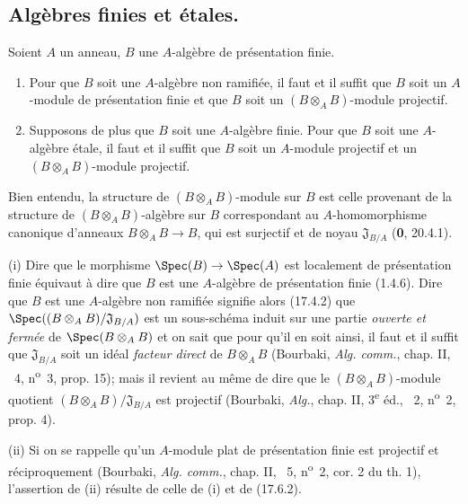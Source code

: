 \subsection{Algèbres finies et étales.}

\begin{proposition}[18.3.1]
\label{IV.18.3.1}
Soient $A$ un anneau, $B$ une $A$-algèbre de présentation finie.
\begin{enumerate}
  \item[\textup{(i)}] Pour que $B$ soit une $A$-algèbre non ramifiée, il faut et il suffit que $B$ soit un $A$-module de présentation finie et que $B$ soit un $(B\otimes_A B)$-module projectif.
  \item[\textup{(ii)}] Supposons de plus que $B$ soit une $A$-algèbre finie. Pour que $B$ soit une $A$-algèbre étale, il faut et il suffit que $B$ soit un $A$-module projectif et un $(B\otimes_A B)$-module projectif.
\end{enumerate}
\end{proposition}

Bien entendu, la structure de $(B\otimes_A B)$-module sur $B$ est celle provenant de la structure de $(B\otimes_A B)$-algèbre sur $B$ correspondant au $A$-homomorphisme canonique d'anneaux $B\otimes_A B\to B$, qui est surjectif et de noyau $\mathfrak J_{B/A}$ (\textbf{0}, 20.4.1).

(i) Dire que le morphisme $\Spec(B)\to\Spec(A)$ est localement de présentation finie équivaut à dire que $B$ est une $A$-algèbre de présentation finie (1.4.6). Dire
que $B$ est une $A$-algèbre non ramifiée signifie alors (17.4.2) que $\Spec((B\otimes_A B)/\mathfrak J_{B/A})$ est un sous-schéma induit sur une partie \emph{ouverte et fermée} de $\Spec(B\otimes_A B)$ et on sait que pour qu'il en soit ainsi, il faut et il suffit que $\mathfrak J_{B/A}$ soit un idéal \emph{facteur direct} de $B\otimes_A B$ (Bourbaki, \emph{Alg. comm.}, chap. II, \textsection~4, n\textsuperscript{o}~3, prop. 15); mais il revient au même de dire que le $(B\otimes_A B)$-module quotient $(B\otimes_A B)/\mathfrak J_{B/A}$ est projectif (Bourbaki, \emph{Alg.}, chap. II, 3\textsuperscript{e} éd., \textsection~2, n\textsuperscript{o}~2, prop. 4).

(ii) Si on se rappelle qu'un $A$-module plat de présentation finie est projectif et réciproquement (Bourbaki, \emph{Alg. comm.}, chap. II, \textsection~5, n\textsuperscript{o}~2, cor. 2 du th. 1), l'assertion de (ii) résulte de celle de (i) et de (17.6.2).

